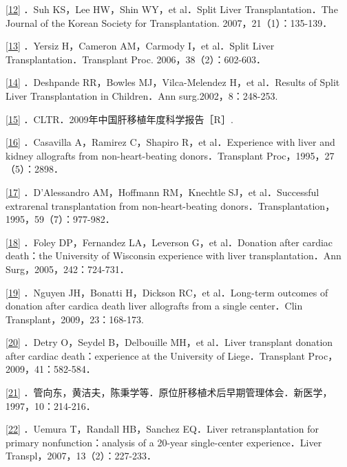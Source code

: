 \protect\hyperlink{text00020.htmlux5cux23ch12-19-back}{{[}12{]}} ．Suh
KS，Lee HW，Shin WY，et al．Split Liver Transplantation．The Journal of
the Korean Society for Transplantation. 2007，21（1）：135-139．

\protect\hyperlink{text00020.htmlux5cux23ch13-19-back}{{[}13{]}}
．Yersiz H，Cameron AM，Carmody I，et al．Split Liver
Transplantation．Transplant Proc. 2006，38（2）：602-603．

\protect\hyperlink{text00020.htmlux5cux23ch14-19-back}{{[}14{]}}
．Deshpande RR，Bowles MJ，Vilca-Melendez H，et al．Results of Split
Liver Transplantation in Children．Ann surg.2002，8：248-253.

\protect\hyperlink{text00020.htmlux5cux23ch15-19-back}{{[}15{]}}
．CLTR．2009年中国肝移植年度科学报告［R］.

\protect\hyperlink{text00020.htmlux5cux23ch16-19-back}{{[}16{]}}
．Casavilla A，Ramirez C，Shapiro R，et al．Experience with liver and
kidney allografts from non-heart-beating donors．Transplant
Proc，1995，27（5）：2898．

\protect\hyperlink{text00020.htmlux5cux23ch17-19-back}{{[}17{]}}
．D'Alessandro AM，Hoffmann RM，Knechtle SJ，et al．Successful
extrarenal transplantation from non-heart-beating
donors．Transplantation，1995，59（7）：977-982．

\protect\hyperlink{text00020.htmlux5cux23ch18-19-back}{{[}18{]}} ．Foley
DP，Fernandez LA，Leverson G，et al．Donation after cardiac death：the
University of Wisconsin experience with liver transplantation．Ann
Surg，2005，242：724-731．

\protect\hyperlink{text00020.htmlux5cux23ch19-19-back}{{[}19{]}}
．Nguyen JH，Bonatti H，Dickson RC，et al．Long-term outcomes of
donation after cardica death liver allografts from a single center．Clin
Transplant，2009，23：168-173.

\protect\hyperlink{text00020.htmlux5cux23ch20-19-back}{{[}20{]}} ．Detry
O，Seydel B，Delbouille MH，et al．Liver transplant donation after
cardiac death：experience at the University of Liege．Transplant
Proc，2009，41：582-584．

\protect\hyperlink{text00020.htmlux5cux23ch21-19-back}{{[}21{]}}
．管向东，黄洁夫，陈秉学等．原位肝移植术后早期管理体会．新医学，1997，10：214-216．

\protect\hyperlink{text00020.htmlux5cux23ch22-19-back}{{[}22{]}}
．Uemura T，Randall HB，Sanchez EQ．Liver retransplantation for primary
nonfunction：analysis of a 20-year single-center experience．Liver
Transpl，2007，13（2）：227-233．

